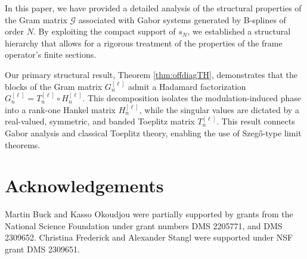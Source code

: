 \documentclass{article}
\begin{document}
In this paper, we have provided a detailed analysis of the structural properties of the Gram matrix $\mathscr{G}$ associated with Gabor systems generated by B-splines of order $N$. By exploiting the compact support of $s_N$, we established a structural hierarchy that allows for a rigorous treatment of the properties of the frame operator's finite sections.

Our primary structural result, Theorem \ref{thm:offdiagTH}, demonstrates that the blocks of the Gram matrix $G_n^{[\ell]}$ admit a Hadamard factorization $G_n^{[\ell]} = T_n^{[\ell]} \circ H_n^{[\ell]}$. This decomposition isolates the modulation-induced phase into a rank-one Hankel matrix $H_n^{[\ell]}$, while the singular values are dictated by a real-valued, symmetric, and banded Toeplitz matrix $T_n^{[\ell]}$. This result connects Gabor analysis and classical Toeplitz theory, enabling the use of Szegő-type limit theorems.





\section{Acknowledgements}
Martin Buck and Kasso Okoudjou were partially supported by grants from the National Science Foundation under grant numbers DMS 2205771, and DMS 2309652. Christina Frederick and Alexander Stangl were supported under NSF grant DMS 2309651.
\end{document}
